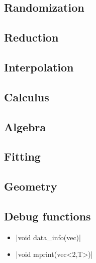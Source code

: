 
\subsection{Randomization \label{SEC:support:math:random}}


\subsection{Reduction \label{SEC:support:math:reduce}}


\subsection{Interpolation \label{SEC:support:math:interp}}


\subsection{Calculus \label{SEC:support:math:calculus}}


\subsection{Algebra \label{SEC:support:math:algebra}}


\subsection{Fitting \label{SEC:support:math:fit}}


\subsection{Geometry \label{SEC:support:math:geometry}}


\subsection{Debug functions \label{SEC:support:math:debug}}

\begin{itemize}
\item \cppinline|void data_info(vec)| 
\item \cppinline|void mprint(vec<2,T>)| 
\end{itemize}
